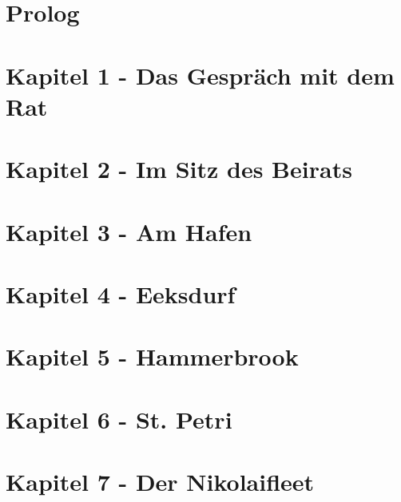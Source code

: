 
\section{\textbf{Prolog}}


\section{\textbf{Kapitel 1 - Das Gespräch mit dem Rat}}



\section{\textbf{Kapitel 2 - Im Sitz des Beirats}}



\section{\textbf{Kapitel 3 - Am Hafen}}
\label{Hafen}


\section{\textbf{Kapitel 4 - Eeksdurf}}
\label{xd}


\section{\textbf{Kapitel 5 - Hammerbrook}}
\label{arm}


\section{\textbf{Kapitel 6 - St. Petri}}
\label{Petri}


\section{\textbf{Kapitel 7 - Der Nikolaifleet}}
\label{Fleet}

